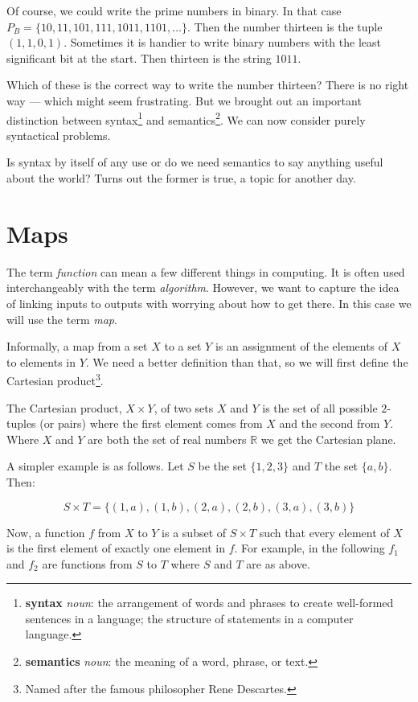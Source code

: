 \documentclass{iansnotes}
\begin{document}
  Of course, we could write the prime numbers in binary.
  In that case $P_B = \{ 10, 11, 101, 111, 1011, 1101, \ldots \}$.
  Then the number thirteen is the tuple $(1,1,0,1)$.
  Sometimes it is handier to write binary numbers with the least significant bit at the start.
  Then thirteen is the string $1011$.

  Which of these is the correct way to write the number thirteen?
  There is no right way --- which might seem frustrating.
  But we brought out an important distinction between syntax\footnote{\textbf{syntax} \emph{noun}: the arrangement of words and phrases to create well-formed sentences in a language; the structure of statements in a computer language.} and semantics\footnote{\textbf{semantics} \emph{noun}: the meaning of a word, phrase, or text.}.
  We can now consider purely syntactical problems.
  
  Is syntax by itself of any use or do we need semantics to say anything useful about the world?
  Turns out the former is true, a topic for another day.

\section{Maps}
  The term \emph{function} can mean a few different things in computing.
  It is often used interchangeably with the term \emph{algorithm}.
  However, we want to capture the idea of linking inputs to outputs with worrying about how to get there.
  In this case we will use the term \emph{map}.

  Informally, a map from a set $X$ to a set $Y$ is an assignment of the elements of $X$ to elements in $Y$\autocite[7]{sipser}.
  We need a better definition than that, so we will first define the Cartesian product\footnote{Named after the famous philosopher Rene Descartes.}.
  
  The Cartesian product, $X \times Y$, of two sets $X$ and $Y$ is the set of all possible $2$-tuples (or pairs) where the first element comes from $X$ and the second from $Y$.
  Where $X$ and $Y$ are both the set of real numbers $\mathbb{R}$ we get the Cartesian plane.

  A simpler example is as follows.
  Let $S$ be the set $\{1, 2, 3\}$ and $T$ the set $\{a, b\}$.
  Then:

  \[S \times T = \{ (1,a), (1,b), (2,a), (2,b), (3,a), (3,b)\}\]

  Now, a function $f$ from $X$ to $Y$ is a subset of $S \times T$ such that every element of $X$ is the first element of exactly one element in $f$.
  For example, in the following $f_1$ and $f_2$ are functions from $S$ to $T$ where $S$ and $T$ are as above.
\end{document}
